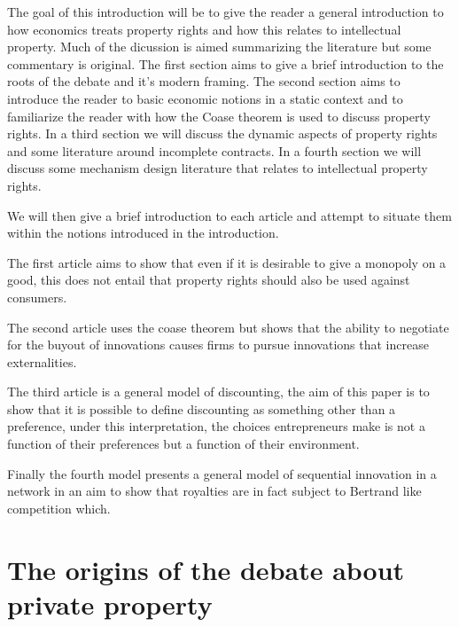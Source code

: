 \documentclass[12pt]{article}
\numberwithin{equation}{section}
\begin{document}
The goal of this introduction will be to give the reader a general introduction to how economics treats property rights and how this relates to intellectual property. Much of the dicussion is aimed summarizing the literature but some commentary is original. The first section aims to give a brief introduction to the roots of the debate and it's modern framing. The second section aims to introduce the reader to basic economic notions in a static context and to familiarize the reader with how the Coase theorem is used to discuss property rights. In a third section we will discuss the dynamic aspects of property rights and some literature around incomplete contracts. In a fourth section we will discuss some mechanism design literature that relates to intellectual property rights. 

We will then give a brief introduction to each article and attempt to situate them within the notions introduced in the introduction. 

The first article aims to show that even if it is desirable to give a monopoly on a good, this does not entail that property rights should also be used against consumers. 

The second article uses the coase theorem but shows that the ability to negotiate for the buyout of innovations causes firms to pursue innovations that increase externalities. 

The third article is a general model of discounting, the aim of this paper is to show that it is possible to define discounting as something other than a preference, under this interpretation, the choices entrepreneurs make is not a function of their preferences but a function of their environment. 

Finally the fourth model presents a general model of sequential innovation in a network in an aim to show that royalties are in fact subject to Bertrand like competition which.

\section{The origins of the debate about private property}
\end{document}
